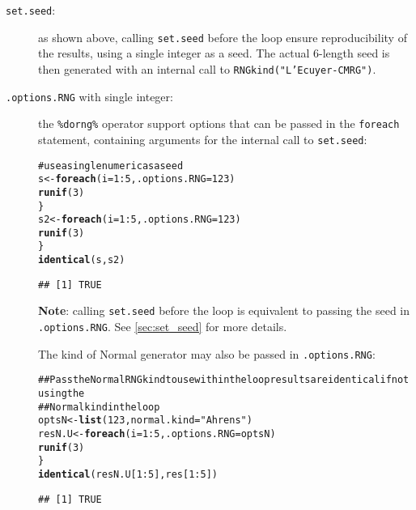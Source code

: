 \documentclass[a4paper,12pt]{article}\usepackage{graphicx, color}
\makeatletter
\newcommand{\hlfunctioncall}[1]{\textcolor[rgb]{0.501960784313725,0,0.329411764705882}{\textbf{#1}}}%
\newcommand{\hlstring}[1]{\textcolor[rgb]{0.6,0.6,1}{#1}}%
\newcommand{\hlcomment}[1]{\textcolor[rgb]{0.180392156862745,0.6,0.341176470588235}{#1}}%
\newenvironment{kframe}{%
 \def\at@end@of@kframe{}%
 \ifinner\ifhmode%
  \def\at@end@of@kframe{\end{minipage}}%
  \begin{minipage}{\columnwidth}%
 \fi\fi%
 \def\FrameCommand##1{\hskip\@totalleftmargin \hskip-\fboxsep
 \colorbox{shadecolor}{##1}\hskip-\fboxsep
     \hskip-\linewidth \hskip-\@totalleftmargin \hskip\columnwidth}%
 \MakeFramed {\advance\hsize-\width
   \@totalleftmargin\z@ \linewidth\hsize
   \@setminipage}}%
 {\par\unskip\endMakeFramed%
 \at@end@of@kframe}
\newenvironment{knitrout}{}{} %
\renewenvironment{knitrout}{\begin{footnotesize}}{\end{footnotesize}}
\let\code=\texttt
\newcommand{\dorng}{\code{\%dorng\%}\xspace}
\makeatother
\begin{document}
\begin{description}
  \item[\code{set.seed}:] as shown above, calling \code{set.seed} before the
  loop ensure reproducibility of the results, using a single integer as a seed. 
  The actual 6-length seed is then generated with an internal call to 
  \code{RNGkind("L'Ecuyer-CMRG")}.
  \item[\code{.options.RNG} with single integer:] the \dorng operator
  support options that can be passed in the \code{foreach} statement, containing
  arguments for the internal call to \code{set.seed}:
  
\begin{knitrout}
\color{fgcolor}\begin{kframe}
\begin{alltt}
\hlcomment{# use a single numeric as a seed}
s <- \hlfunctioncall{foreach}(i = 1:5, .options.RNG = 123) %dorng% \{
    \hlfunctioncall{runif}(3)
\}
s2 <- \hlfunctioncall{foreach}(i = 1:5, .options.RNG = 123) %dorng% \{
    \hlfunctioncall{runif}(3)
\}
\hlfunctioncall{identical}(s, s2)
\end{alltt}
\begin{verbatim}
## [1] TRUE
\end{verbatim}
\end{kframe}
\end{knitrout}


\noindent \textbf{Note}: calling \code{set.seed} before the loop is equivalent 
to passing the seed in \code{.options.RNG}. 
See \cref{sec:set_seed} for more details.

\medskip
The kind of Normal generator may also be passed in \code{.options.RNG}:
\begin{knitrout}
\color{fgcolor}\begin{kframe}
\begin{alltt}
\hlcomment{## Pass the Normal RNG kind to use within the loop results are identical if not using the}
\hlcomment{## Normal kind in the loop}
optsN <- \hlfunctioncall{list}(123, normal.kind = \hlstring{"Ahrens"})
resN.U <- \hlfunctioncall{foreach}(i = 1:5, .options.RNG = optsN) %dorng% \{
    \hlfunctioncall{runif}(3)
\}
\hlfunctioncall{identical}(resN.U[1:5], res[1:5])
\end{alltt}
\begin{verbatim}
## [1] TRUE
\end{verbatim}
\begin{alltt}


\end{alltt}
\end{kframe}
\end{knitrout}
\end{description}
\end{document}
